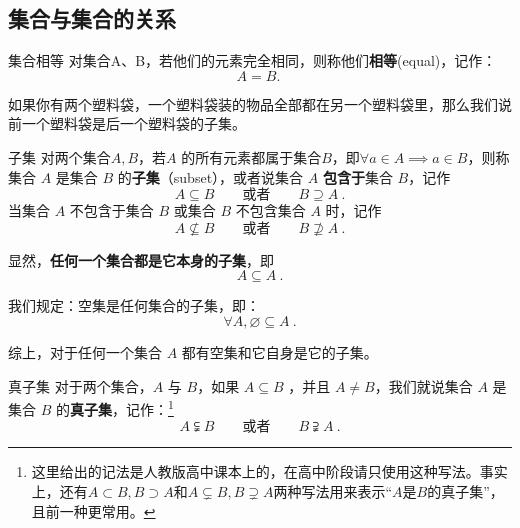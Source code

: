 \subsection{集合与集合的关系}

\begin{definition}{集合相等}
对集合A、B，若他们的元素完全相同，则称他们\textbf{相等}(equal)，记作：
\begin{equation}
A=B.~
\end{equation}
\end{definition}

如果你有两个塑料袋，一个塑料袋装的物品全部都在另一个塑料袋里，那么我们说前一个塑料袋是后一个塑料袋的子集。

\begin{definition}{子集}
对两个集合$A,B$，若$A$ 的所有元素都属于集合$B$，即$\forall a\in A\implies a\in B$，则称集合 $A$ 是集合 $B$ 的\textbf{子集}（subset），或者说集合 $A$ \textbf{包含于}集合 $B$，记作
\begin{equation}
A \subseteq B\qquad\text{或者}\qquad B \supseteq A~.
\end{equation}
当集合 $A$ 不包含于集合 $B$ 或集合 $B$ 不包含集合 $A$ 时，记作
\begin{equation}
A \nsubseteq B\qquad\text{或者}\qquad B \nsupseteq A~.
\end{equation}
\end{definition}

显然，\textbf{任何一个集合都是它本身的子集}，即
\begin{equation}
A \subseteq A~.
\end{equation}

我们规定：空集是任何集合的子集，即：
\begin{equation}
\forall A,\varnothing \subseteq A~.
\end{equation}

综上，对于任何一个集合 $A$ 都有空集和它自身是它的子集。

\begin{definition}{真子集}
对于两个集合，$A$ 与 $B$，如果 $A\subseteq B$ ，并且 $A \ne B$，我们就说集合 $A$ 是集合 $B$ 的\textbf{真子集}，记作：\footnote{这里给出的记法是人教版高中课本上的，在高中阶段请只使用这种写法。事实上，还有$A\subset B,B\supset A$和$A\subsetneq B,B\supsetneq A$两种写法用来表示“$A$是$B$的真子集”，且前一种更常用。}
\begin{equation}
A \subsetneqq B\qquad\text{或者}\qquad B \supsetneqq A~.
\end{equation}
\end{definition}
